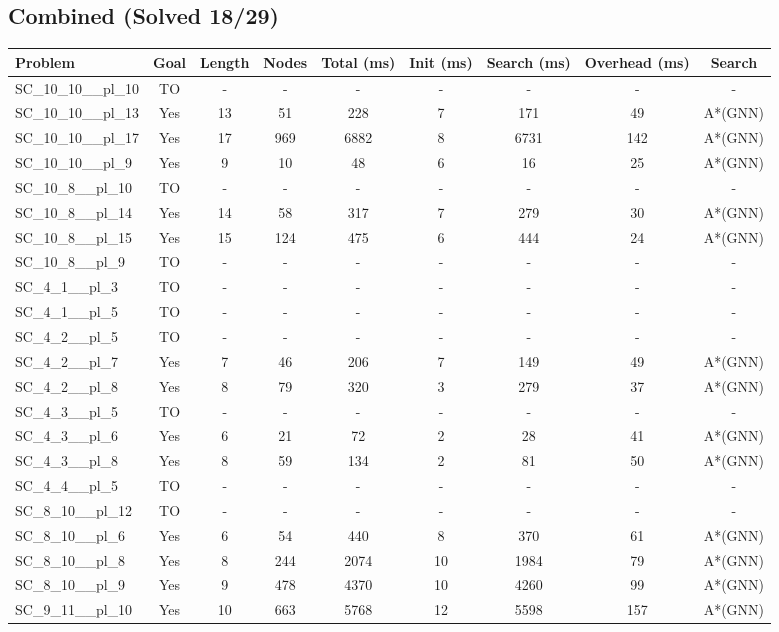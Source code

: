 \documentclass{article}
\begin{document}
\subsection*{Combined (Solved 18/29)}
\begin{tabular}{lcccccccc}
\toprule
Problem & Goal & Length & Nodes & Total (ms) & Init (ms) & Search (ms) & Overhead (ms) & Search \\
\midrule
SC\_10\_10\_\_pl\_10 & TO & - & - & - & - & - & - & - \\
SC\_10\_10\_\_pl\_13 & Yes & 13 & 51 & 228 & 7 & 171 & 49 & A*(GNN) \\
SC\_10\_10\_\_pl\_17 & Yes & 17 & 969 & 6882 & 8 & 6731 & 142 & A*(GNN) \\
SC\_10\_10\_\_pl\_9 & Yes & 9 & 10 & 48 & 6 & 16 & 25 & A*(GNN) \\
SC\_10\_8\_\_pl\_10 & TO & - & - & - & - & - & - & - \\
SC\_10\_8\_\_pl\_14 & Yes & 14 & 58 & 317 & 7 & 279 & 30 & A*(GNN) \\
SC\_10\_8\_\_pl\_15 & Yes & 15 & 124 & 475 & 6 & 444 & 24 & A*(GNN) \\
SC\_10\_8\_\_pl\_9 & TO & - & - & - & - & - & - & - \\
SC\_4\_1\_\_pl\_3 & TO & - & - & - & - & - & - & - \\
SC\_4\_1\_\_pl\_5 & TO & - & - & - & - & - & - & - \\
SC\_4\_2\_\_pl\_5 & TO & - & - & - & - & - & - & - \\
SC\_4\_2\_\_pl\_7 & Yes & 7 & 46 & 206 & 7 & 149 & 49 & A*(GNN) \\
SC\_4\_2\_\_pl\_8 & Yes & 8 & 79 & 320 & 3 & 279 & 37 & A*(GNN) \\
SC\_4\_3\_\_pl\_5 & TO & - & - & - & - & - & - & - \\
SC\_4\_3\_\_pl\_6 & Yes & 6 & 21 & 72 & 2 & 28 & 41 & A*(GNN) \\
SC\_4\_3\_\_pl\_8 & Yes & 8 & 59 & 134 & 2 & 81 & 50 & A*(GNN) \\
SC\_4\_4\_\_pl\_5 & TO & - & - & - & - & - & - & - \\
SC\_8\_10\_\_pl\_12 & TO & - & - & - & - & - & - & - \\
SC\_8\_10\_\_pl\_6 & Yes & 6 & 54 & 440 & 8 & 370 & 61 & A*(GNN) \\
SC\_8\_10\_\_pl\_8 & Yes & 8 & 244 & 2074 & 10 & 1984 & 79 & A*(GNN) \\
SC\_8\_10\_\_pl\_9 & Yes & 9 & 478 & 4370 & 10 & 4260 & 99 & A*(GNN) \\
SC\_9\_11\_\_pl\_10 & Yes & 10 & 663 & 5768 & 12 & 5598 & 157 & A*(GNN) \\

\end{tabular}
\end{document}
